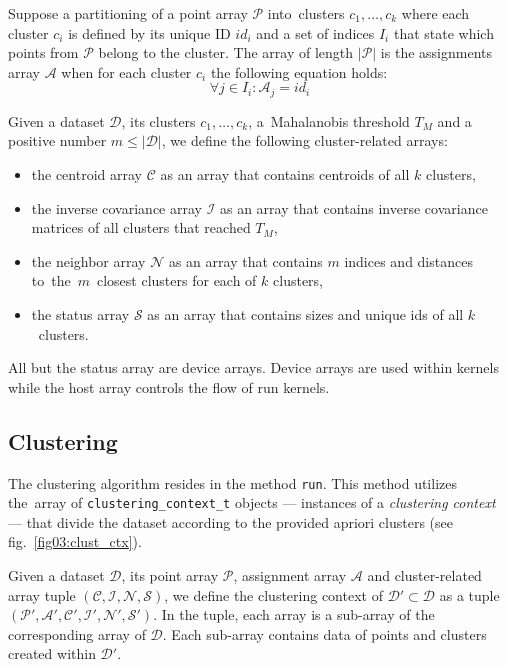 \begin{defn}
	Suppose a partitioning of a point array $\mathcal{P}$ into~clusters $c_1,\dots,c_k$ where each cluster $c_i$ is defined by its unique ID $id_i$ and a set of indices $I_i$ that state which points from $\mathcal{P}$ belong to the cluster. The array of length $|\mathcal{P}|$ is the assignments array $\mathcal{A}$ when for each cluster $c_i$ the following equation holds:
	$${\forall j \in I_i : \mathcal{A}_j = id_i}$$
	\label{def03:assign}
\end{defn}

\begin{defn}
	Given a dataset $\mathcal{D}$, its clusters $c_1,\dots,c_k$, a~Mahalanobis threshold $T_M$ and a positive number $m \le |\mathcal{D}|$, we define the following cluster-related arrays:
	\begin{itemize}
		\item the centroid array $\mathcal{C}$ as an array that contains centroids of all $k$ clusters,
		\item the inverse covariance array $\mathcal{I}$ as an array that contains inverse covariance matrices of all clusters that reached $T_M$,
		\item the neighbor array $\mathcal{N}$ as an array that contains $m$ indices and distances to~the~$m$~closest clusters for each of $k$ clusters,
		\item the status array $\mathcal{S}$ as an array that contains sizes and unique ids of all $k$~clusters.
	\end{itemize}
	\label{def03:tuple}
\end{defn}


All but the status array are device arrays. Device arrays are used within kernels while the host array controls the flow of run kernels.  


\subsection{Clustering}
The clustering algorithm resides in the method \texttt{run}. This method utilizes the~array of \texttt{clustering\_context\_t} objects --- instances of a \emph{clustering context} --- that divide the dataset according to the provided apriori clusters (see fig.~\ref{fig03:clust_ctx}).

\begin{defn}
	Given a dataset $\mathcal{D}$, its point array $\mathcal{P}$, assignment array $\mathcal{A}$ and cluster-related array tuple $(\mathcal{C}, \mathcal{I}, \mathcal{N}, \mathcal{S})$, we define the clustering context of $\mathcal{D}' \subset \mathcal{D}$ as a tuple $(\mathcal{P'}, \mathcal{A'}, \mathcal{C'}, \mathcal{I'}, \mathcal{N'}, \mathcal{S'})$. In the tuple, each array is a sub-array of the corresponding array of $\mathcal{D}$. Each sub-array contains data of points and clusters created within $\mathcal{D}'$.
	\label{def03:context}
\end{defn}

